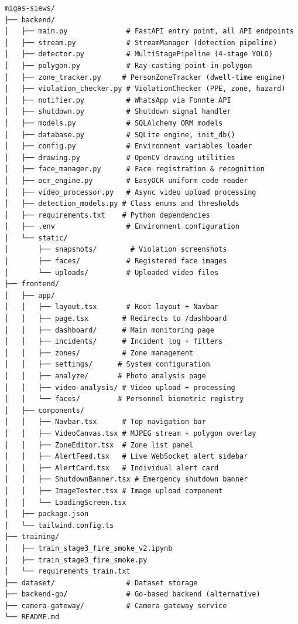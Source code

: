 \documentclass[12pt,a4paper,oneside]{book}
\begin{document}
\begin{verbatim}
migas-siews/
├── backend/
│   ├── main.py              # FastAPI entry point, all API endpoints
│   ├── stream.py            # StreamManager (detection pipeline)
│   ├── detector.py          # MultiStagePipeline (4-stage YOLO)
│   ├── polygon.py           # Ray-casting point-in-polygon
│   ├── zone_tracker.py     # PersonZoneTracker (dwell-time engine)
│   ├── violation_checker.py # ViolationChecker (PPE, zone, hazard)
│   ├── notifier.py          # WhatsApp via Fonnte API
│   ├── shutdown.py          # Shutdown signal handler
│   ├── models.py            # SQLAlchemy ORM models
│   ├── database.py          # SQLite engine, init_db()
│   ├── config.py            # Environment variables loader
│   ├── drawing.py           # OpenCV drawing utilities
│   ├── face_manager.py      # Face registration & recognition
│   ├── ocr_engine.py        # EasyOCR uniform code reader
│   ├── video_processor.py   # Async video upload processing
│   ├── detection_models.py # Class enums and thresholds
│   ├── requirements.txt    # Python dependencies
│   ├── .env                 # Environment configuration
│   └── static/
│       ├── snapshots/        # Violation screenshots
│       ├── faces/           # Registered face images
│       └── uploads/         # Uploaded video files
├── frontend/
│   ├── app/
│   │   ├── layout.tsx       # Root layout + Navbar
│   │   ├── page.tsx        # Redirects to /dashboard
│   │   ├── dashboard/      # Main monitoring page
│   │   ├── incidents/      # Incident log + filters
│   │   ├── zones/          # Zone management
│   │   ├── settings/      # System configuration
│   │   ├── analyze/       # Photo analysis page
│   │   ├── video-analysis/ # Video upload + processing
│   │   └── faces/         # Personnel biometric registry
│   ├── components/
│   │   ├── Navbar.tsx      # Top navigation bar
│   │   ├── VideoCanvas.tsx # MJPEG stream + polygon overlay
│   │   ├── ZoneEditor.tsx  # Zone list panel
│   │   ├── AlertFeed.tsx   # Live WebSocket alert sidebar
│   │   ├── AlertCard.tsx   # Individual alert card
│   │   ├── ShutdownBanner.tsx # Emergency shutdown banner
│   │   ├── ImageTester.tsx # Image upload component
│   │   └── LoadingScreen.tsx
│   ├── package.json
│   └── tailwind.config.ts
├── training/
│   ├── train_stage3_fire_smoke_v2.ipynb
│   ├── train_stage3_fire_smoke.py
│   └── requirements_train.txt
├── dataset/                 # Dataset storage
├── backend-go/              # Go-based backend (alternative)
├── camera-gateway/          # Camera gateway service
└── README.md
\end{verbatim}
\end{document}
